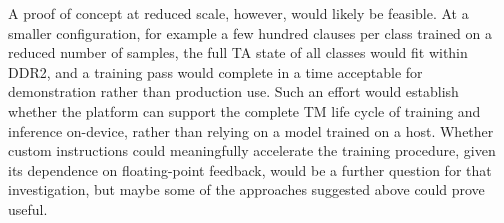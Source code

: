A proof of concept at reduced scale, however, would likely be feasible. At a smaller configuration, for example a few hundred clauses per class trained on a reduced number of samples, the full TA state of all classes would fit within DDR2, and a training pass would complete in a time acceptable for demonstration rather than production use. Such an effort would establish whether the platform can support the complete TM life cycle of training and inference on-device, rather than relying on a model trained on a host. Whether custom instructions could meaningfully accelerate the training procedure, given its dependence on floating-point feedback, would be a further question for that investigation, but maybe some of the approaches suggested above could prove useful.